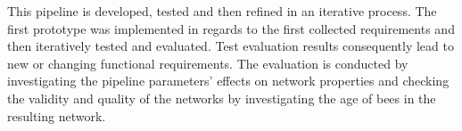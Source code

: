 This pipeline is developed, tested and then refined in an iterative process.
The first prototype was implemented in regards to the first collected requirements and then iteratively tested and evaluated.
Test evaluation results consequently lead to new or changing functional requirements.
The evaluation is conducted by investigating the pipeline parameters' effects on network properties and checking the validity and quality of the networks by investigating the age of bees in the resulting network.








